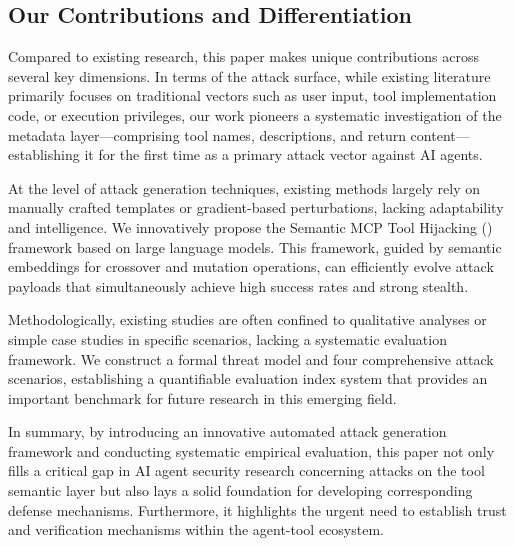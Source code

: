 \subsection{Our Contributions and Differentiation}
Compared to existing research, this paper makes unique contributions across several key dimensions. In terms of the attack surface, while existing literature primarily focuses on traditional vectors such as user input, tool implementation code, or execution privileges, our work pioneers a systematic investigation of the metadata layer—comprising tool names, descriptions, and return content—establishing it for the first time as a primary attack vector against AI agents.

At the level of attack generation techniques, existing methods largely rely on manually crafted templates or gradient-based perturbations, lacking adaptability and intelligence. We innovatively propose the Semantic MCP Tool Hijacking (\methodacronym) framework based on large language models. This framework, guided by semantic embeddings for crossover and mutation operations, can efficiently evolve attack payloads that simultaneously achieve high success rates and strong stealth.

Methodologically, existing studies are often confined to qualitative analyses or simple case studies in specific scenarios, lacking a systematic evaluation framework. We construct a formal threat model and four comprehensive attack scenarios, establishing a quantifiable evaluation index system that provides an important benchmark for future research in this emerging field.

In summary, by introducing an innovative automated attack generation framework and conducting systematic empirical evaluation, this paper not only fills a critical gap in AI agent security research concerning attacks on the tool semantic layer but also lays a solid foundation for developing corresponding defense mechanisms. Furthermore, it highlights the urgent need to establish trust and verification mechanisms within the agent-tool ecosystem.


